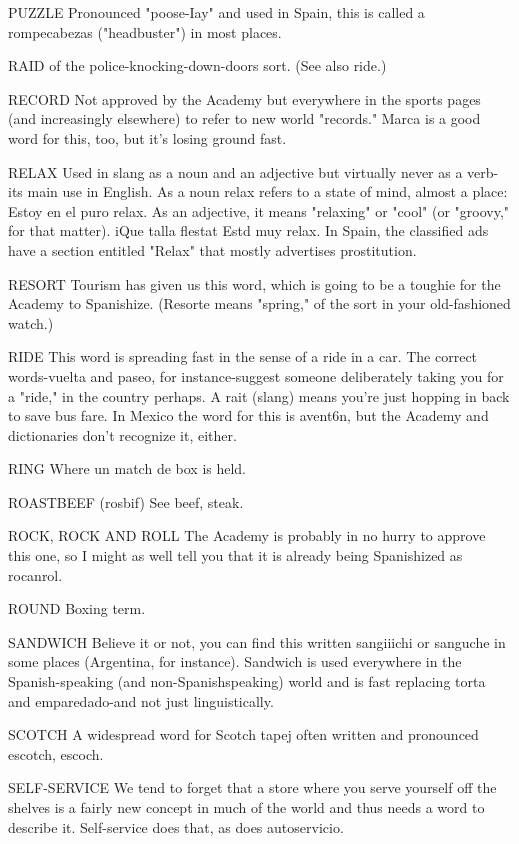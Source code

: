 PUZZLE Pronounced "poose-Iay" and used in Spain, this is
called a rompecabezas ("headbuster") in most places.

RAID of the police-knocking-down-doors sort. (See also ride.)

RECORD Not approved by the Academy but everywhere in
the sports pages (and increasingly elsewhere) to refer to new world "records." Marca is a good word for this, too, but it's losing ground fast.

RELAX Used in slang as a noun and an adjective but virtually
never as a verb-its main use in English. As a noun relax refers to a
state of mind, almost a place: Estoy en el puro relax. As an adjective, it
means "relaxing" or "cool" (or "groovy," for that matter). iQue talla
flestat Estd muy relax. In Spain, the classified ads have a section entitled "Relax" that mostly advertises prostitution.

RESORT Tourism has given us this word, which is going to
be a toughie for the Academy to Spanishize. (Resorte means "spring,"
of the sort in your old-fashioned watch.)

RIDE This word is spreading fast in the sense of a ride in a
car. The correct words-vuelta and paseo, for instance-suggest someone deliberately taking you for a "ride," in the country perhaps. A rait
(slang) means you're just hopping in back to save bus fare. In Mexico
the word for this is avent6n, but the Academy and dictionaries don't
recognize it, either.

RING Where un match de box is held.

ROASTBEEF (rosbif) See beef, steak.

ROCK, ROCK AND ROLL The Academy is probably in no
hurry to approve this one, so I might as well tell you that it is already being Spanishized as rocanrol.

ROUND Boxing term.

SANDWICH Believe it or not, you can find this written sangiiichi or sanguche in some places (Argentina, for instance). Sandwich is used everywhere in the Spanish-speaking (and non-Spanishspeaking) world and is fast replacing torta and emparedado-and not
just linguistically.

SCOTCH A widespread word for Scotch tapej often written
and pronounced escotch, escoch.

SELF-SERVICE We tend to forget that a store where you serve
yourself off the shelves is a fairly new concept in much of the world
and thus needs a word to describe it. Self-service does that, as does
autoservicio.


